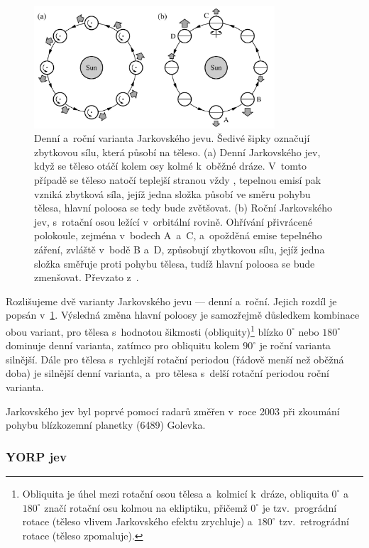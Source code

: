 \documentclass[A4paper, 12pt, oneside]{book}
\begin{document}
\begin{figure} 
	\centering

		\includegraphics[width=0.8\textwidth]{obr/jarkovskeho_jev.png}
	\caption{Denní a~roční varianta Jarkovského jevu. Šedivé šipky
	označují zbytkovou sílu, která působí na těleso. (a) Denní Jarkovského jev, když se těleso otáčí kolem osy kolmé k~oběžné dráze. V~tomto případě se těleso natočí teplejší stranou vždy , tepelnou emisí pak vzniká zbytková síla, jejíž jedna složka působí ve směru pohybu tělesa, hlavní poloosa se tedy bude zvětšovat. (b) Roční Jarkovského jev, s~rotační osou ležící v~orbitální rovině. Ohřívání přivrácené polokoule, zejména v~bodech A~a~C, a~opožděná emise tepelného záření, zvláště v~bodě B a~D, způsobují zbytkovou sílu, jejíž jedna složka směřuje proti pohybu tělesa, tudíž hlavní poloosa se bude zmenšovat. Převzato z~\cite{fmt}.} \label{fig:jarko}
\end{figure}

Rozlišujeme dvě varianty Jarkovského jevu --- denní a~roční. Jejich rozdíl je popsán v~\ref{fig:jarko}. Výsledná změna hlavní poloosy je samozřejmě důsledkem kombinace obou variant, pro tělesa s~hodnotou šikmosti (obliquity)\footnote{Obliquita je úhel mezi rotační osou tělesa a~kolmicí k~dráze, obliquita $0^\circ$ a~$180^\circ$ značí rotační osu kolmou na ekliptiku, přičemž $0^\circ$ je tzv.\ prográdní rotace (těleso vlivem Jarkovského efektu zrychluje) a~$180^\circ$ tzv.\ retrográdní rotace (těleso zpomaluje).} blízko $0^\circ$ nebo $180^\circ$ dominuje denní varianta, zatímco pro obliquitu kolem $90^\circ$ je roční varianta silnější. Dále pro tělesa s~rychlejší rotační periodou (řádově menší než oběžná doba) je silnější denní varianta, a~pro tělesa s~delší rotační periodou roční varianta. 

Jarkovského jev byl poprvé pomocí radarů změřen v~roce 2003 při zkoumání pohybu blízkozemní planetky (6489) Golevka.~\cite{chesley03}
\subsubsection{YORP jev}
\end{document}
